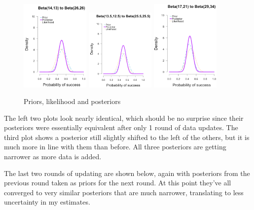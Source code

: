 \begin{figure}[h]
    \centering
\includegraphics[width=0.3\textwidth]{pic/p05c03-snip08-1.png}
\includegraphics[width=0.3\textwidth]{pic/p05c03-snip08-2.png}
\includegraphics[width=0.3\textwidth]{pic/p05c03-snip08-3.png}
    \caption{Priors, likelihood and posteriors}
    \label{fig:p05c03-snip08}
\end{figure}


The left two plots look nearly identical, which should be no surprise since their posteriors were essentially equivalent after only 1 round of data updates. The third plot shows a posterior still slightly shifted to the left of the others, but it is much more in line with them than before. All three posteriors are getting narrower as more data is added.

The last two rounds of updating are shown below, again with posteriors from the previous round taken as priors for the next round. At this point they've all converged to very similar posteriors that are much narrower, translating to less uncertainty in my estimates.

